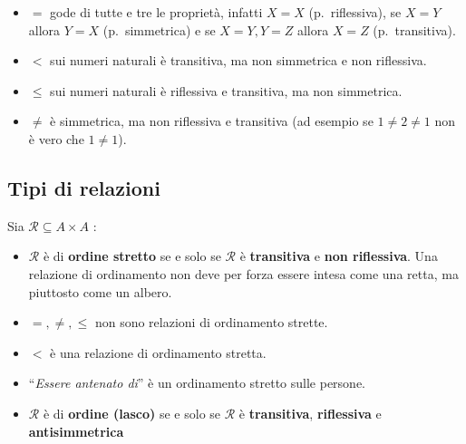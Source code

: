 \documentclass[
  a4paper,
]{article}
\providecommand{\tightlist}{%
  \setlength{\itemsep}{0pt}\setlength{\parskip}{0pt}}
\begin{document}
\begin{examplebox}[Esempi]

\begin{itemize}
\tightlist
\item
  \(=\) gode di tutte e tre le proprietà, infatti \(X = X\)
  (p.~riflessiva), se \(X = Y\) allora \(Y = X\) (p.~simmetrica) e se
  \(X = Y, Y = Z\) allora \(X = Z\) (p.~transitiva).
\item
  \(<\) sui numeri naturali è transitiva, ma non simmetrica e non
  riflessiva.
\item
  \(\leq\) sui numeri naturali è riflessiva e transitiva, ma non
  simmetrica.
\item
  \(\not =\) è simmetrica, ma non riflessiva e transitiva (ad esempio se
  \(1 \not = 2 \not = 1\) non è vero che \(1 \not = 1\)).
\end{itemize}

\end{examplebox}

\hypertarget{tipi-di-relazioni}{%
\subsection{Tipi di relazioni}\label{tipi-di-relazioni}}

Sia \(\mathcal{R} \subseteq A \times A\) :

\begin{itemize}
\tightlist
\item
  \(\mathcal{R}\) è di \textbf{ordine stretto} se e solo se
  \(\mathcal{R}\) è \textbf{transitiva} e \textbf{non riflessiva}. Una
  relazione di ordinamento non deve per forza essere intesa come una
  retta, ma piuttosto come un albero.
\end{itemize}

\begin{examplebox}[Esempi]

\begin{itemize}
\tightlist
\item
  \(=, \not = , \leq\) non sono relazioni di ordinamento strette.
\item
  \(<\) è una relazione di ordinamento stretta.
\item
  ``\emph{Essere antenato di}'' è un ordinamento stretto sulle persone.
\end{itemize}

\end{examplebox}

\begin{itemize}
\tightlist
\item
  \(\mathcal{R}\) è di \textbf{ordine (lasco)} se e solo se
  \(\mathcal{R}\) è \textbf{transitiva}, \textbf{riflessiva} e
  \textbf{antisimmetrica}
\end{itemize}
\end{document}
